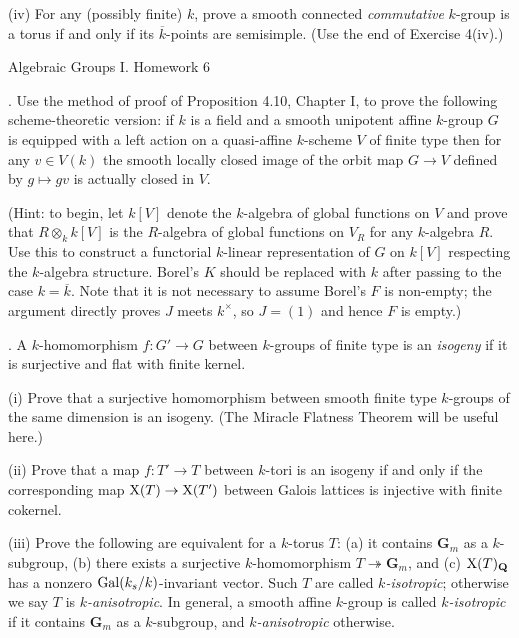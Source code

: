 \documentclass[10pt]{amsart}
\begin{document}
(iv) For any (possibly finite) $k$, prove a smooth connected {\em commutative} $k$-group is a torus if and only if 
its $\overline{k}$-points are semisimple.  (Use the end of Exercise 4(iv).) 

\newpage

\centerline{\sc Algebraic Groups I. Homework 6}

\medskip{}.  Use the method of proof of Proposition 4.10, Chapter I, to prove the following scheme-theoretic version:
if $k$ is a field and a smooth unipotent affine $k$-group $G$ is equipped with a left
action on a quasi-affine $k$-scheme $V$ of finite type then for any $v \in V(k)$
the smooth locally closed image of the orbit map $G \rightarrow V$ defined by $g \mapsto gv$ is
actually closed in $V$.  

(Hint: to begin, let $k[V]$ denote the $k$-algebra of global functions on $V$
and prove that $R \otimes_k k[V]$ is the $R$-algebra of global functions on $V_R$ for any $k$-algebra $R$.
Use this to construct a functorial $k$-linear representation of $G$ on $k[V]$ respecting the $k$-algebra structure.
Borel's $K$ should be replaced with $k$ after passing to the case
$k = \overline{k}$.  Note that it is not necessary to assume Borel's $F$ is non-empty; the argument directly proves $J$ meets
$k^{\times}$, so $J = (1)$ and hence $F$ is empty.)

\medskip{}.  A $k$-homomorphism $f:G' \rightarrow G$ between $k$-groups of finite type is an {\em isogeny} if
it is surjective and flat with finite kernel.

(i) Prove that a surjective homomorphism between smooth finite type $k$-groups of the same dimension is an isogeny.
(The Miracle Flatness Theorem will be useful here.)

(ii) Prove that a map $f:T' \rightarrow T$ between $k$-tori is an isogeny if and only if the corresponding map
${\rm{X}}(T) \rightarrow {\rm{X}}(T')$ between Galois lattices is injective with finite cokernel.

(iii) Prove the following are equivalent for a $k$-torus $T$: (a) it contains ${\mathbf{G}}_m$ as a $k$-subgroup, 
(b) there exists a surjective $k$-homomorphism $T \twoheadrightarrow \mathbf{G}_m$, and (c) ${\rm{X}}(T)_{\mathbf{Q}}$ has a nonzero
${\rm{Gal}}(k_s/k)$-invariant vector.   Such $T$ are called {\em $k$-isotropic}; otherwise we say $T$ is
{\em $k$-anisotropic}.  In general, a smooth affine $k$-group is called {\em $k$-isotropic} if it contains
${\mathbf{G}}_m$ as a $k$-subgroup, and {\em $k$-anisotropic} otherwise. 
\end{document}

